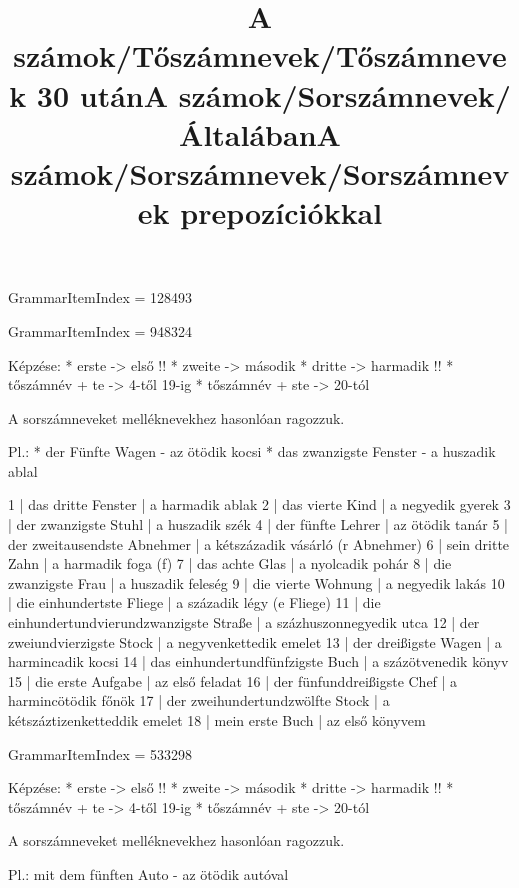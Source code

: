 \title{A számok/Tőszámnevek/Tőszámnevek 30 után}

GrammarItemIndex = 128493

\begin{desc}
\end{desc}

\begin{exmp}
\end{exmp}

\title{A számok/Sorszámnevek/Általában}

GrammarItemIndex = 948324

\begin{desc}
Képzése: * erste -> első !!
* zweite -> második
* dritte -> harmadik !!
* tőszámnév + te -> 4-től 19-ig
* tőszámnév + ste -> 20-tól

A sorszámneveket melléknevekhez hasonlóan ragozzuk.

Pl.: * der Fünfte Wagen - az ötödik kocsi
* das zwanzigste Fenster - a huszadik ablal
\end{desc}

\begin{exmp}
1 | das dritte Fenster | a harmadik ablak
2 | das vierte Kind | a negyedik gyerek
3 | der zwanzigste Stuhl | a huszadik szék
4 | der fünfte Lehrer | az ötödik tanár
5 | der zweitausendste Abnehmer | a kétszázadik vásárló (r Abnehmer)
6 | sein dritte Zahn | a harmadik foga (f)
7 | das achte Glas | a nyolcadik pohár 
8 | die zwanzigste Frau | a huszadik feleség
9 | die vierte Wohnung | a negyedik lakás
10 | die einhundertste Fliege | a századik légy (e Fliege)
11 | die einhundertundvierundzwanzigste Straße | a százhuszonnegyedik utca
12 | der zweiundvierzigste Stock | a negyvenkettedik emelet
13 | der dreißigste Wagen | a harmincadik kocsi
14 | das einhundertundfünfzigste Buch | a százötvenedik könyv
15 | die erste Aufgabe | az első feladat
16 | der fünfunddreißigste Chef | a harmincötödik főnök
17 | der zweihundertundzwölfte Stock | a kétszáztizenketteddik emelet
18 | mein erste Buch | az első könyvem
\end{exmp}

\title{A számok/Sorszámnevek/Sorszámnevek prepozíciókkal}

GrammarItemIndex = 533298

\begin{desc}
Képzése: * erste -> első !!
* zweite -> második
* dritte -> harmadik !!
* tőszámnév + te -> 4-től 19-ig
* tőszámnév + ste -> 20-tól

A sorszámneveket melléknevekhez hasonlóan ragozzuk.

Pl.: mit dem fünften Auto - az ötödik autóval
\end{desc}

